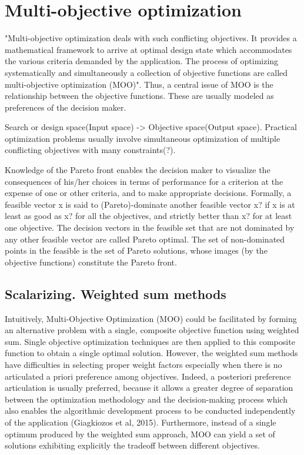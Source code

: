     
    \section{Multi-objective optimization}
        "Multi-objective optimization deals with such conflicting objectives. It provides a
        mathematical framework to arrive at optimal design state which accommodates the various criteria demanded by
        the application. The process of optimizing systematically and simultaneously a collection of objective functions
        are called multi-objective optimization (MOO)\cite{odugod2013}".
        Thus, a central issue of MOO is the relationship between the objective functions. These are usually modeled as preferences of the decision maker.

        Search or design space(Input space) -> Objective space(Output space).
        Practical optimization problems usually involve simultaneous optimization of multiple conflicting objectives with many constraints(?).

        Knowledge of the Pareto front enables the decision maker to visualize the consequences of his/her choices in terms of performance 
        for a criterion at the expense of one or other criteria, and to make appropriate decisions. Formally, a feasible vector x is said to (Pareto)-dominate another feasible vector x? if
        x is at least as good as x? for all the objectives, and strictly better than x? for at least one objective. The decision vectors in the feasible set 
        that are not dominated by any other feasible vector are called Pareto optimal. The set of non-dominated points in the 
        feasible is the set of Pareto solutions, whose images (by the objective functions) constitute the Pareto front.\cite{Audet2018PerformanceII}


        \subsection{Scalarizing. Weighted sum methods}
            Intuitively, Multi-Objective Optimization (MOO) could be
            facilitated by forming an alternative problem with a single,
            composite objective function using weighted sum. Single
            objective optimization techniques are then applied to this
            composite function to obtain a single optimal solution.
            However, the weighted sum methods have difficulties in
            selecting proper weight factors especially when there is no
            articulated a priori preference among objectives. Indeed, a
            posteriori preference articulation is usually preferred, because it
            allows a greater degree of separation between the optimization
            methodology and the decision-making process which also
            enables the algorithmic development process to be conducted
            independently of the application (Giagkiozos et al, 2015).
            Furthermore, instead of a single optimum produced by the
            weighted sum approach, MOO can yield a set of solutions
            exhibiting explicitly the tradeoff between different objectives. \cite{DBLP:journals/corr/abs-1812-07958}


